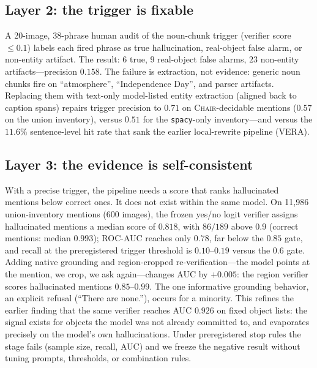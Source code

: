 \documentclass[11pt]{article}
\newcommand{\chair}{\textsc{Chair}}
\begin{document}
\subsection{Layer 2: the trigger is fixable}
A 20-image, 38-phrase human audit of the noun-chunk trigger (verifier score $\le 0.1$) labels each fired phrase as true hallucination, real-object false alarm, or non-entity artifact. The result: $6$ true, $9$ real-object false alarms, $23$ non-entity artifacts---precision $0.158$. The failure is extraction, not evidence: generic noun chunks fire on ``atmosphere'', ``Independence Day'', and parser artifacts. Replacing them with text-only model-listed entity extraction (aligned back to caption spans) repairs trigger precision to $0.71$ on \chair{}-decidable mentions ($0.57$ on the union inventory), versus $0.51$ for the \verb|spacy|-only inventory---and versus the $11.6\%$ sentence-level hit rate that sank the earlier local-rewrite pipeline (VERA).

\subsection{Layer 3: the evidence is self-consistent}
With a precise trigger, the pipeline needs a score that ranks hallucinated mentions below correct ones. It does not exist within the same model. On 11{,}986 union-inventory mentions (600 images), the frozen yes/no logit verifier assigns hallucinated mentions a median score of $0.818$, with $86/189$ above $0.9$ (correct mentions: median $0.993$); ROC-AUC reaches only $0.78$, far below the $0.85$ gate, and recall at the preregistered trigger threshold is $0.10$--$0.19$ versus the $0.6$ gate. Adding native grounding and region-cropped re-verification---the model points at the mention, we crop, we ask again---changes AUC by $+0.005$: the region verifier scores hallucinated mentions $0.85$--$0.99$. The one informative grounding behavior, an explicit refusal (``There are none.''), occurs for a minority. This refines the earlier finding that the same verifier reaches AUC $0.926$ on fixed object lists: the signal exists for objects the model was not already committed to, and evaporates precisely on the model's own hallucinations. Under preregistered stop rules the stage fails (sample size, recall, AUC) and we freeze the negative result without tuning prompts, thresholds, or combination rules.
\end{document}
